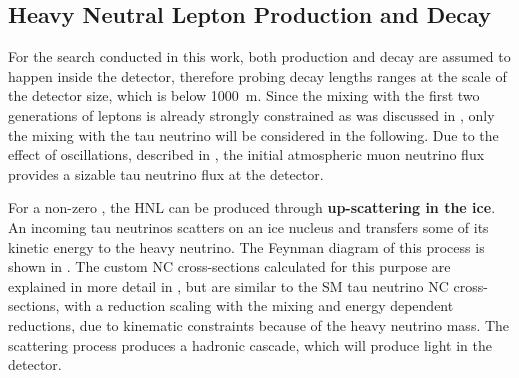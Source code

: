 \subsection{Heavy Neutral Lepton Production and Decay} 


For the search conducted in this work, both production and decay are assumed to happen inside the detector, therefore probing decay lengths ranges at the scale of the detector size, which is below \SI{1000}{\meter}. Since the mixing with the first two generations of leptons is already strongly constrained as was discussed in , only the mixing with the tau neutrino will be considered in the following. Due to the effect of oscillations, described in , the initial atmospheric muon neutrino flux provides a sizable tau neutrino flux at the detector.


For a non-zero , the HNL can be produced through \textbf{up-scattering in the ice}. An incoming tau neutrinos scatters on an ice nucleus and transfers some of its kinetic energy to the heavy neutrino. The Feynman diagram of this process is shown in . The custom NC cross-sections calculated for this purpose are explained in more detail in , but are similar to the SM tau neutrino NC cross-sections, with a reduction scaling with the mixing  and energy dependent reductions, due to kinematic constraints because of the heavy neutrino mass. The scattering process produces a hadronic cascade, which will produce light in the detector.

